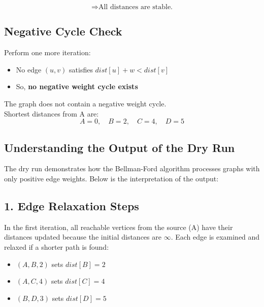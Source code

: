 \documentclass[14pt,a4paper]{extarticle}
\begin{document}
\[
\Rightarrow \text{All distances are stable.}
\]

\subsection*{Negative Cycle Check}

Perform one more iteration:

\begin{itemize}
  \item No edge $(u, v)$ satisfies $dist[u] + w < dist[v]$
  \item So, \textbf{no negative weight cycle exists}
\end{itemize}

\begin{tcolorbox}[colback=white, colframe=black, title=Final Result]
The graph does not contain a negative weight cycle. \\
Shortest distances from A are:
\[
\boxed{
A = 0, \quad B = 2, \quad C = 4, \quad D = 5
}
\]
\end{tcolorbox}

\subsection{Understanding the Output of the Dry Run}

The dry run demonstrates how the Bellman-Ford algorithm processes graphs with only positive edge weights. Below is the interpretation of the output:

\subsection*{1. Edge Relaxation Steps}

In the first iteration, all reachable vertices from the source (A) have their distances updated because the initial distances are $\infty$. Each edge is examined and relaxed if a shorter path is found:

\begin{itemize}
    \item $(A, B, 2)$ sets $dist[B] = 2$
    \item $(A, C, 4)$ sets $dist[C] = 4$
    \item $(B, D, 3)$ sets $dist[D] = 5$
\end{itemize}
\end{document}
